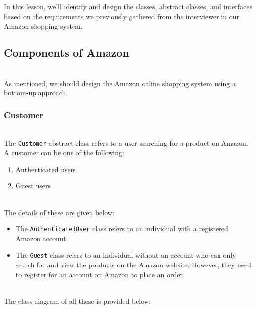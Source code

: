 

In this lesson, we'll identify and design the classes, abstract classes, and interfaces based on the requirements we previously gathered from the interviewer in our Amazon shopping system.

\subsection{Components of Amazon}\label{GpkLyt7GW5-VOqXXpXFm_}
\\
As mentioned, we should design the Amazon online shopping system using a bottom-up approach.

\subsubsection{Customer}\label{hY4BSdSDGiNBYSYe7VLVs}
\\
The \texttt{Customer} abstract class refers to a user searching for a product on Amazon.
\\
A customer can be one of the following:

\begin{enumerate}
\item
\protect{}\label{VaSAkpaMwt8js5sMwN5Ps}
Authenticated users
\item
\protect{}\label{GJ0iVP8hIOde4Awhphjaa}
Guest users
\end{enumerate}
\\
The details of these are given below:

\begin{itemize}
\item
\protect{}\label{YmWjoALaxBDlevYeVPMlR}
The \texttt{AuthenticatedUser} class refers to an individual with a registered Amazon account.
\item
\protect{}\label{OWMulwZvkY6Xi-6zUZhge}
The \texttt{Guest} class refers to an individual without an account who can only search for and view the products on the Amazon website. However, they need to register for an account on Amazon to place an order.
\end{itemize}
\\
The class diagram of all these is provided below:

